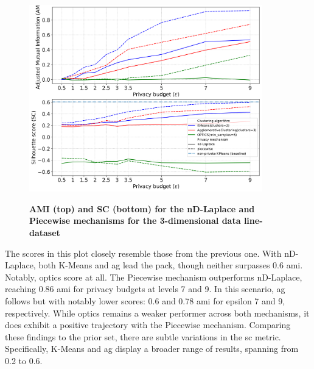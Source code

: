 \begin{figure}[H]
  \centering
  \caption{\textbf{AMI (top) and SC (bottom) for the nD-Laplace and Piecewise mechanisms for the 3-dimensional data line-dataset}}
  \includegraphics[width=0.9\textwidth]{Results/nd-laplace/nd-Laplace/line-dataset/ami-and-sc_3_dimensions.png}
  \label{fig:validation-line-dataset_comparison_3d-laplace}
\end{figure}
The scores in this plot closely resemble those from the previous one. With nD-Laplace, both K-Means and \gls{ag} lead the pack, though neither surpasses 0.6 \gls{ami}. Notably, \gls{optics}  score at all.
The Piecewise mechanism outperforms nD-Laplace, reaching 0.86 \gls{ami} for privacy budgets at levels 7 and 9. In this scenario, \gls{ag} follows but with notably lower scores: 0.6 and 0.78 \gls{ami} for epsilon 7 and 9, respectively. While \gls{optics} remains a weaker performer across both mechanisms, it does exhibit a positive trajectory with the Piecewise mechanism.
Comparing these findings to the prior set, there are subtle variations in the \gls{sc} metric. Specifically, K-Means and \gls{ag} display a broader range of results, spanning from 0.2 to 0.6.
\newpage
